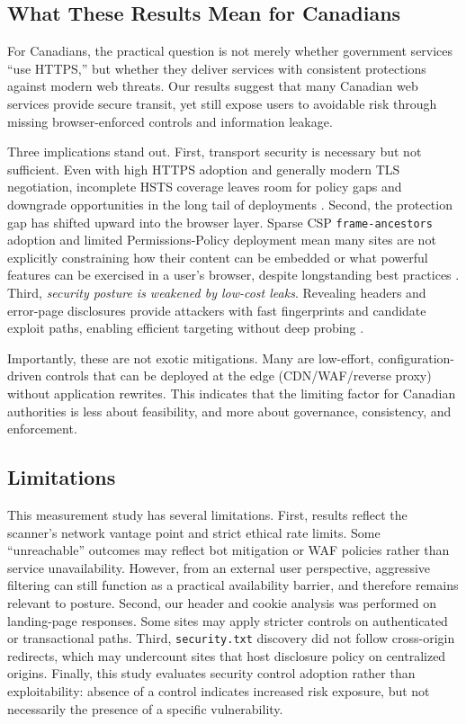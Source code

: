 \documentclass[pdflatex,sn-mathphys-num]{sn-jnl}
\numberwithin{equation}{section}
\theoremstyle{thmstyleone}
\theoremstyle{thmstyletwo}%
\theoremstyle{thmstylethree}%
\begin{document}
\subsection{What These Results Mean for Canadians}

For Canadians, the practical question is not merely whether government services ``use HTTPS,'' but whether they
deliver services with consistent protections against modern web threats. Our results suggest that many Canadian
web services provide secure transit, yet still expose users to avoidable risk through missing
browser-enforced controls and information leakage.

Three implications stand out. First, transport security is necessary but not sufficient. Even with
high HTTPS adoption and generally modern TLS negotiation, incomplete HSTS coverage leaves room for
policy gaps and downgrade opportunities in the long tail of deployments \cite{rfc6797}. 
Second, the protection gap has shifted upward into the browser layer. Sparse CSP \texttt{frame-ancestors} adoption and
limited Permissions-Policy deployment mean many sites are not explicitly constraining
how their content can be embedded or what powerful features can be exercised in a user’s browser, despite
longstanding best practices \cite{owasp_clickjacking_defense,mdn_csp_guide}.
Third, \emph{security posture is weakened by low-cost leaks}. Revealing
headers and error-page disclosures provide attackers with fast fingerprints and candidate exploit paths, enabling efficient
targeting without deep probing \cite{cwe_200,cwe_209}.


Importantly, these are not exotic mitigations. Many are low-effort, configuration-driven controls that can be
deployed at the edge (CDN/WAF/reverse proxy) without application rewrites. This indicates that the limiting factor
for Canadian authorities is less about feasibility, and more about governance, consistency, and enforcement.

\subsection{Limitations}

This measurement study has several limitations. First, results reflect the scanner’s network vantage point and
strict ethical rate limits. Some ``unreachable'' outcomes may reflect bot mitigation or WAF policies rather than
service unavailability. However, from an external user perspective, aggressive filtering can still function as a
practical availability barrier, and therefore remains relevant to posture. Second, our header and cookie analysis
was performed on landing-page responses. Some sites may apply stricter controls on authenticated or transactional
paths. Third, \texttt{security.txt} discovery did not follow cross-origin redirects, which may undercount sites
that host disclosure policy on centralized origins. Finally, this study evaluates security control adoption rather
than exploitability: absence of a control indicates increased risk exposure, but not necessarily the presence of a
specific vulnerability.
\end{document}
